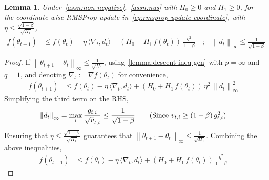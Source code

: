 \documentclass{article}
\newtheorem{lemma}{Lemma}
\newcommand{\ti}[1]{#1_{t,i}}
\newcommand{\normsq}[1]{\left\|#1 \right\|^{2}}
\newcommand{\norm}[1]{\left\|#1 \right\|}
\newcommand{\tht}{\theta_t}
\newcommand{\thtt}{\theta_{t+1}}
\begin{document}
\begin{lemma}
Under~\cref{assn:non-negative},~\cref{assn:nus} with $H_0 \geq 0$ and $H_1 \geq 0$, for the coordinate-wise RMSProp update in~\cref{eq:rmsprop-update-coordinate}, with $\eta \leq \frac{\sqrt{1-\beta}}{\sqrt{H_1}}$, 
\begin{align*}
f(\thtt) & \leq f(\tht) - \eta \, \langle \nabla_t, d_t \rangle +  \left(H_0 + H_1 \, f(\tht) \right) \, \frac{\eta^2}{1 - \beta} \quad \text{;} \quad \norm{d_t}_\infty \leq \frac{1}{\sqrt{1 - \beta}}
\end{align*}   
\label{lemma:rms-descent}
\end{lemma}
\begin{proof}
If $\norm{\thtt - \tht}_\infty \leq \frac{1}{\sqrt{H_1}}$, using~\cref{lemma:descent-ineq-gen} with $p = \infty$ and $q = 1$, and denoting $\nabla_t := \nabla f(\tht)$ for convenience,
\begin{align*}
f(\thtt) & \leq f(\tht) - \eta \, \langle \nabla_t, d_t \rangle + \left(H_0 + H_1 \, f(\tht) \right) \, \eta^2 \,  \normsq{d_t}_\infty
\end{align*}
Simplifying the third term on the RHS, 
\begin{align*}
\norm{d_t}_\infty = \max_{i} \frac{\ti{g}}{\ti{\sqrt{v}}} \leq \frac{1}{\sqrt{1 - \beta}} \tag{Since $\ti{v} \geq (1-\beta) \, \ti{g^2}$} 
\end{align*}
Ensuring that $\eta \leq \frac{\sqrt{1-\beta}}{\sqrt{H_1}}$ guarantees that $\norm{\thtt - \tht}_\infty \leq \frac{1}{\sqrt{H_1}}$. Combining the above inequalities, 
\begin{align}
f(\thtt) & \leq f(\tht) - \eta \, \langle \nabla_t, d_t \rangle +  \left(H_0 + H_1 \, f(\tht) \right) \, \frac{\eta^2}{1 - \beta}
\end{align}    
\end{proof}
\end{document}
